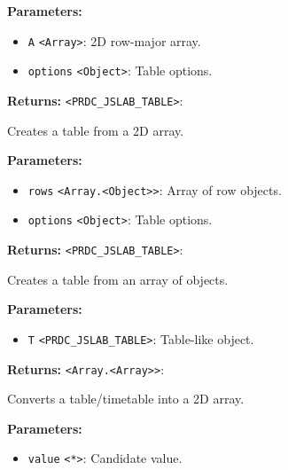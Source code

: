 \documentclass[12pt,a4paper]{article}
\begin{document}
\noindent \textbf{Parameters:}
\begin{itemize}
  \item \texttt{A} \texttt{<Array>}: 2D row-major array.
  \item \texttt{options} \texttt{<Object>}: Table options.
\end{itemize}

\noindent \textbf{Returns:} \texttt{<PRDC\_JSLAB\_TABLE>}:

\noindent Creates a table from a 2D array.

\vspace{5mm}
\noindent {}


\noindent \textbf{Parameters:}
\begin{itemize}
  \item \texttt{rows} \texttt{<Array.<Object>>}: Array of row objects.
  \item \texttt{options} \texttt{<Object>}: Table options.
\end{itemize}

\noindent \textbf{Returns:} \texttt{<PRDC\_JSLAB\_TABLE>}:

\noindent Creates a table from an array of objects.

\vspace{5mm}
\noindent {}


\noindent \textbf{Parameters:}
\begin{itemize}
  \item \texttt{T} \texttt{<PRDC\_JSLAB\_TABLE>}: Table-like object.
\end{itemize}

\noindent \textbf{Returns:} \texttt{<Array.<Array>>}:

\noindent Converts a table/timetable into a 2D array.

\vspace{5mm}
\noindent {}


\noindent \textbf{Parameters:}
\begin{itemize}
  \item \texttt{value} \texttt{<*>}: Candidate value.
\end{itemize}
\end{document}
